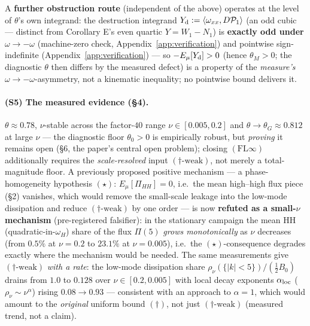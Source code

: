 \documentclass[11pt]{article}
\theoremstyle{remark}
\theoremstyle{plain}
\newcommand{\eqdef}{:=}
\begin{document}
A \textbf{further obstruction route} (independent of the above) operates at
the level of $\theta$'s own integrand: the destruction integrand $Y_{\rm d} \eqdef \langle\omega_{xx}, D\mathcal{P}_1\rangle$ (an odd cubic --- distinct from Corollary E's even quartic $Y = W_1 - N_1$) is
\textbf{exactly odd under $\omega \to -\omega$} (machine-zero check, Appendix~\ref{app:verification}) and
pointwise sign-indefinite (Appendix~\ref{app:verification}) --- so $-E_\mu[Y_{\rm d}] > 0$
(hence $\theta_M > 0$; the diagnostic $\theta$ then differs by the measured defect) is a
property of the \emph{measure's} $\omega\to-\omega$-asymmetry, not a kinematic
inequality; no pointwise bound delivers it.

\paragraph{(S5) The measured evidence (\S4).} $\theta \approx 0.78$, $\nu$-stable across
the factor-$40$ range $\nu \in [0.005, 0.2]$ and $\theta \to \theta_G \approx 0.812$ at large $\nu$ ---
the diagnostic floor $\theta_0 > 0$ is empirically robust, but \emph{proving} it remains open
(\S6, the paper's central open problem); closing $(\mathrm{FL}\infty)$ additionally requires the
\emph{scale-resolved} input $(\dagger\text{-weak})$, not merely a total-magnitude floor. A
previously proposed positive mechanism --- a phase-homogeneity hypothesis
$(\star)$: $E_\mu[\Pi_{HH}] = 0$, i.e.\ the mean high--high flux piece (\S2) vanishes, which
would remove the small-scale leakage into the low-mode dissipation and reduce
$(\dagger\text{-weak})$ by one order --- is now \textbf{refuted as a small-$\nu$ mechanism}
(pre-registered falsifier): in the stationary campaign the mean HH (quadratic-in-$\omega_H$)
share of the flux $\Pi(5)$ \emph{grows monotonically} as $\nu$ decreases
(from $0.5\%$ at $\nu=0.2$ to $23.1\%$ at $\nu=0.005$), i.e.\ the
$(\star)$-consequence degrades exactly where the mechanism would be needed. The
same measurements give $(\dagger\text{-weak})$ \emph{with a rate}: the low-mode
dissipation share $\rho_\nu(\{|k|<5\})/(\tfrac12 B_0)$ drains from $1.0$ to $0.128$
over $\nu \in [0.2, 0.005]$ with local decay exponents $\alpha_{\rm loc}$
($\rho_\nu \sim \nu^{\alpha}$) rising $0.08 \to 0.93$ --- consistent with an
approach to $\alpha = 1$, which would amount to the \emph{original} uniform bound
$(\dagger)$, not just $(\dagger\text{-weak})$ (measured trend, not a claim).
\end{document}
